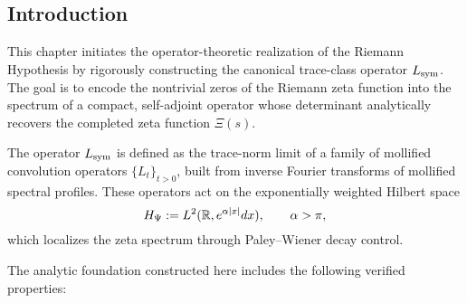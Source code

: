 \subsection*{Introduction}

This chapter initiates the operator-theoretic realization of the Riemann Hypothesis by rigorously constructing the canonical trace-class operator \( L_{\mathrm{sym}} \). The goal is to encode the nontrivial zeros of the Riemann zeta function into the spectrum of a compact, self-adjoint operator whose determinant analytically recovers the completed zeta function \( \Xi(s) \).

The operator \( L_{\mathrm{sym}} \) is defined as the trace-norm limit of a family of mollified convolution operators \( \{L_t\}_{t > 0} \), built from inverse Fourier transforms of mollified spectral profiles. These operators act on the exponentially weighted Hilbert space
\[
H_{\Psi} := L^2(\mathbb{R}, e^{\alpha |x|} dx), \qquad \alpha > \pi,
\]
which localizes the zeta spectrum through Paley--Wiener decay control.

\vspace{0.5em}

\begin{center}
\end{center}

\vspace{0.5em}

The analytic foundation constructed here includes the following verified properties:

